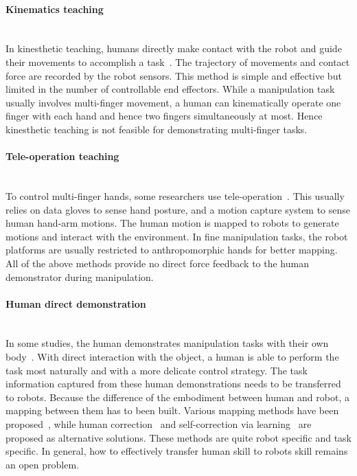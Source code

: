 \paragraph{Kinematics teaching} ~\\
In kinesthetic teaching, humans directly make contact with the robot and guide their movements to accomplish a task~\cite{korkinof2013online,pais2014encoding,pastor2011skill,Miao2014}. The trajectory of movements and contact force are recorded by the robot sensors.
This method is simple and effective but limited in the number of controllable end effectors. While a manipulation task usually involves multi-finger movement, a human can kinematically operate one finger with each hand and hence two fingers simultaneously at most. Hence kinesthetic teaching is not feasible for demonstrating multi-finger tasks.

\paragraph{Tele-operation teaching} ~\\
To control multi-finger hands, some researchers use tele-operation~\cite{bernardino2013precision,kondo2008recognition,Fischer98}. This usually relies on data gloves to sense hand posture, and a motion capture system to sense human hand-arm motions. The human motion is mapped to robots to generate motions and interact with the environment. In fine manipulation tasks, the robot platforms are usually restricted to anthropomorphic hands for better mapping. All of the above methods provide no direct force feedback to the human demonstrator during manipulation.

\paragraph{Human direct demonstration} ~\\
In some studies, the human demonstrates manipulation tasks with their own body~\cite{asfour2008imitation}. With direct interaction with the object, a human is able to perform the task most naturally and with a more delicate control strategy. The task information captured from these human demonstrations needs to be transferred to robots. Because the difference of the embodiment between human and robot, a mapping between them has to been built. Various mapping methods have been proposed~\cite{do2011towards,asfour2008imitation,hueser2006learning}, while human correction~\cite{calinon2007incremental,sauser2011iterative,romano2011human} and self-correction via learning~\cite{bidan2013robio} are proposed as alternative solutions. These methods are quite robot specific and task specific. In general, how to effectively transfer human skill to robots skill remains an open problem.

